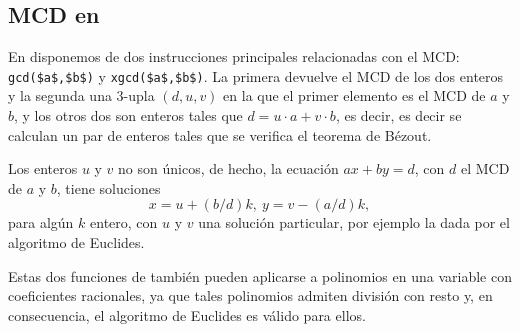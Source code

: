\subsection{MCD en {\sage}}

En {\sage} disponemos de dos instrucciones principales relacionadas con el MCD:
\lstinline|gcd($a$,$b$)| y \lstinline|xgcd($a$,$b$)|. La primera devuelve el MCD
de los
dos enteros y la segunda una $3$-upla $(d,u,v)$ en la que el primer elemento es
el MCD de $a$ y $b$,  y los otros dos son enteros tales que $d=u\cdot
a+v\cdot b$, es decir, es decir se calculan un par de enteros tales que se
verifica el teorema de Bézout. 

Los enteros $u$ y $v$ no son \'unicos, de hecho, la ecuación $ax+by=d$, con $d$
el MCD de $a$ y $b$, tiene soluciones
$$x=u+(b/d)k,\ y=v-(a/d)k,$$
para alg\'un $k$ entero, con $u$ y $v$ una solución particular, por ejemplo la
dada por el algoritmo de Euclides.

Estas dos funciones de {\sage} tambi\'en pueden aplicarse a polinomios en una
variable con coeficientes racionales, ya que tales polinomios admiten divisi\'on
con resto y, en consecuencia, el algoritmo de Euclides es v\'alido para ellos. 

\

